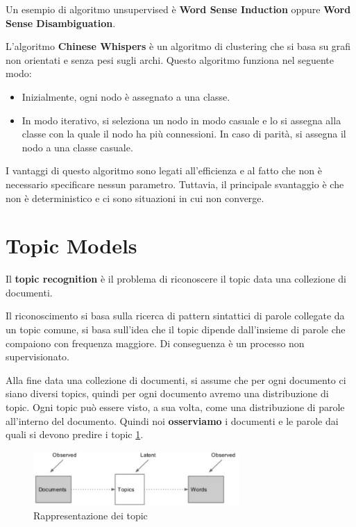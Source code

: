 Un esempio di algoritmo unsupervised è \textbf{Word Sense Induction} oppure
\textbf{Word Sense Disambiguation}.

L'algoritmo \textbf{Chinese Whispers} è un algoritmo di clustering che si basa
su grafi non orientati e senza pesi sugli archi. Questo algoritmo funziona nel
seguente modo:
\begin{itemize}
      \item Inizialmente, ogni nodo è assegnato a una classe.
      \item In modo iterativo, si seleziona un nodo in modo casuale e lo si assegna
            alla classe con la quale il nodo ha più connessioni. In caso di
            parità, si assegna il nodo a una classe casuale.
\end{itemize}
I vantaggi di questo algoritmo sono legati all'efficienza e al fatto che non è
necessario specificare nessun parametro. Tuttavia, il principale svantaggio è
che non è deterministico e ci sono situazioni in cui non converge.
\section{Topic Models}
\begin{definizione}
      Il \textbf{topic recognition} è il problema di riconoscere il topic data una
      collezione di documenti.
\end{definizione}

Il riconoscimento si basa sulla ricerca di pattern sintattici di parole collegate
da un topic comune, si basa sull'idea che il topic dipende dall'insieme di parole
che compaiono con frequenza maggiore. Di conseguenza è un processo non supervisionato.

Alla fine data una collezione di documenti, si assume che per ogni documento ci siano
diversi topics, quindi per ogni documento avremo una distribuzione di topic.
Ogni topic può essere visto, a sua volta, come una distribuzione di parole all'interno
del documento. Quindi noi \textbf{osserviamo} i documenti e le parole dai quali
si devono predire i topic \ref{fig:topic}.

\begin{figure}[!ht]
      \centering
      \includegraphics[width=0.7\textwidth]{img/nlp/topic_model.png}
      \caption{Rappresentazione dei topic}
      \label{fig:topic}
\end{figure}

